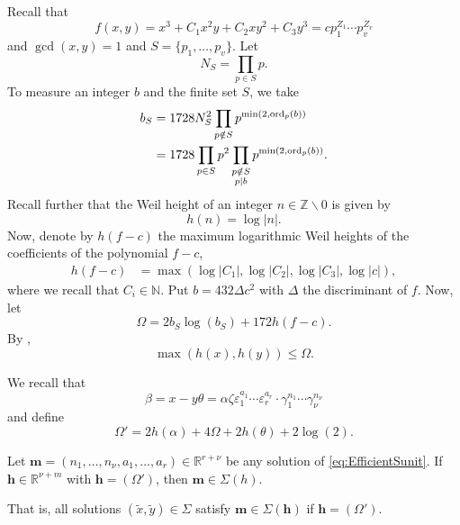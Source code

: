 Recall that 
\[f(x,y) = x^3 + C_1 x^{2}y + C_2xy^2 + C_3y^3 = c p_1^{Z_1} \cdots p_v^{Z_v}\]
and $\gcd(x,y)=1$ and $S = \{p_1, \dots, p_v\}$. Let 
\[N_S = \prod_{p\in S}p.\]
To measure an integer $b$ and the finite set $S$, we take
\begin{align*}
b_S	& = 1728 N_S^2 \prod_{p \notin S} p^{\min(2,\operatorname{ord}_p(b))}\\
	& = 1728 \prod_{p\in S}p^2 \prod_{\substack{p \notin S \\ p \mid b}} p^{\min(2,\operatorname{ord}_p(b))}.
\end{align*}
Recall further that the Weil height of an integer $n \in \mathbb{Z}\backslash {0}$ is given by
\[h(n) = \log|n|.\] 
Now, denote by $h(f-c)$ the maximum logarithmic Weil heights of the coefficients of the polynomial $f - c$,
\begin{align*}
h(f-c) & = \max(\log|C_1|, \log|C_2|, \log|C_3|, \log|c|),		
\end{align*}
where we recall that $C_i \in \mathbb{N}$.
Put $b = 432 \Delta c^2$ with $\Delta$ the discriminant of $f$. Now, let 
\[\Omega = 2b_S \log(b_S) + 172h(f-c).\]
By \cite{KanMat}, 
\[\max(h(x),h(y))\leq \Omega. \]

We recall that  
\[\beta = x-y\theta = \alpha \zeta \varepsilon_1^{a_1} \cdots \varepsilon_r^{a_r}\cdot \gamma_1^{n_1}\cdots \gamma_{\nu}^{n_{\nu}}\]
and define
\[\Omega' = 2h(\alpha) + 4\Omega + 2h(\theta) + 2\log(2).\]

\begin{lemma} \label{lem:TMinitialheight}
Let ${\mathbf{m} = (n_1, \dots, n_{\nu}, a_1, \dots, a_r) \in \mathbb{R}^{r + \nu}}$ be any solution of \eqref{eq:EfficientSunit}. If $\mathbf{h} \in\mathbb{R}^{\nu + m}$ with $\mathbf{h} = (\Omega')$, then $\mathbf{m}\in \Sigma(h)$.
\end{lemma}
That is, all solutions $(\tilde{x},\tilde{y}) \in \Sigma$ satisfy $\mathbf{m}\in \Sigma(\mathbf{h})$ if $\mathbf{h} = (\Omega')$.

